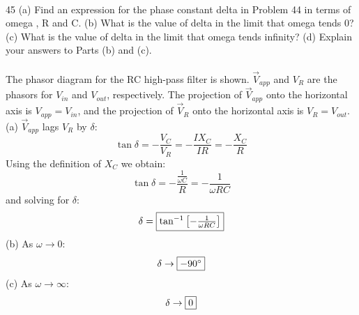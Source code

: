 \documentclass{report}
\begin{document}
\paragraph{}
45 (a) Find an expression for the phase constant delta in Problem 44 in terms of omega , R and C. (b) What is the value of delta in the limit that omega tends 0? (c) What is the value of delta in the limit that omega tends infinity? (d) Explain your answers to Parts (b) and (c).\\
\\
The phasor diagram for the RC high-pass filter is shown. $\vec V_{app}$ and $V_R$ are the phasors for $V_{in}$ and $V_{out}$, respectively. The projection of $\vec V_{app}$ onto the horizontal axis is $V_{app} = V_{in}$, and the projection of $\vec V_R$ onto the horizontal axis is $V_R = V_{out}$.\\
(a) $\vec V_{app}$ lags $V_R$ by $\delta$:
$$\tan \delta = -\frac{V_C}{V_R} = -\frac{IX_C}{IR} = -\frac{X_C}{R}$$
Using the definition of $X_C$ we obtain:
$$\tan \delta = -\frac{\frac{1}{\omega C}}{R} = -\frac{1}{\omega RC}$$
and solving for $\delta$:
$$\delta = \fbox{$\tan^{-1} \left[ -\frac{1}{\omega RC} \right]$}$$
(b) As $\omega \rightarrow 0$:
$$\delta \rightarrow \fbox{$-90^{\circ}$}$$
(c) As $\omega \rightarrow \infty$:
$$\delta \rightarrow \fbox{0}$$
\end{document}
